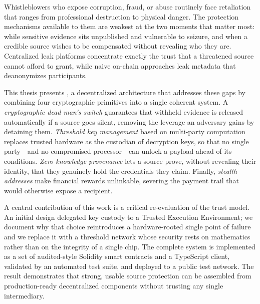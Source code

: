 
Whistleblowers who expose corruption, fraud, or abuse routinely face
retaliation that ranges from professional destruction to physical danger.
The protection mechanisms available to them are weakest at the two moments
that matter most: while sensitive evidence sits unpublished and vulnerable to
seizure, and when a credible source wishes to be compensated without revealing
who they are. Centralized leak platforms concentrate exactly the trust that a
threatened source cannot afford to grant, while naive on-chain approaches leak
metadata that deanonymizes participants.

This thesis presents \zkwns, a decentralized architecture that addresses these
gaps by combining four cryptographic primitives into a single coherent system.
A \emph{cryptographic dead man's switch} guarantees that withheld evidence is
released automatically if a source goes silent, removing the leverage an
adversary gains by detaining them. \emph{Threshold key management} based on
multi-party computation replaces trusted hardware as the custodian of decryption
keys, so that no single party---and no compromised processor---can unlock a
payload ahead of its conditions. \emph{Zero-knowledge provenance} lets a source
prove, without revealing their identity, that they genuinely hold the
credentials they claim. Finally, \emph{stealth addresses} make financial rewards
unlinkable, severing the payment trail that would otherwise expose a recipient.

A central contribution of this work is a critical re-evaluation of the trust
model. An initial design delegated key custody to a Trusted Execution
Environment; we document why that choice reintroduces a hardware-rooted single
point of failure and we replace it with a threshold network whose security rests
on mathematics rather than on the integrity of a single chip. The complete
system is implemented as a set of audited-style Solidity smart contracts and a
TypeScript client, validated by an automated test suite, and deployed to a
public test network. The result demonstrates that strong, usable source
protection can be assembled from production-ready decentralized components
without trusting any single intermediary.
